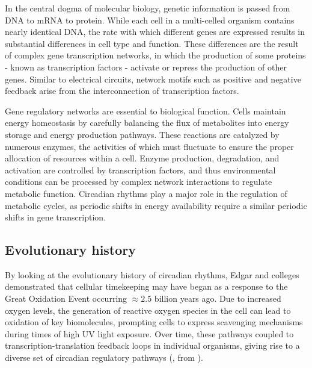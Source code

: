 In the central dogma of molecular biology, genetic information is passed from DNA to mRNA to protein. 
While each cell in a multi-celled organism contains nearly identical DNA, the rate with which different genes are expressed results in substantial differences in cell type and function. 
These differences are the result of complex gene transcription networks, in which the production of some proteins - known as transcription factors - activate or repress the production of other genes. 
Similar to electrical circuits, network motifs such as positive and negative feedback arise from the interconnection of transcription factors.

Gene regulatory networks are essential to biological function. 
Cells maintain energy homeostasis by carefully balancing the flux of metabolites into energy storage and energy production pathways. 
These reactions are catalyzed by numerous enzymes, the activities of which must fluctuate to ensure the proper allocation of resources within a cell.
Enzyme production, degradation, and activation are controlled by transcription factors, and thus environmental conditions can be processed by complex network interactions to regulate metabolic function.
Circadian rhythms play a major role in the regulation of metabolic cycles, as periodic shifts in energy availability require a similar periodic shifts in gene transcription.

\subsection{Evolutionary history}

By looking at the evolutionary history of circadian rhythms, Edgar and colleges \cite{Edgar2012} demonstrated that cellular timekeeping may have began as a response to the Great Oxidation Event occurring $\approx 2.5$ billion years ago. 
Due to increased oxygen levels, the generation of reactive oxygen species in the cell can lead to oxidation of key biomolecules, prompting cells to express scavenging mechanisms during times of high UV light exposure. 
Over time, these pathways coupled to transcription-translation feedback loops in individual organisms, giving rise to a diverse set of circadian regulatory pathways (, from \cite{Edgar2012}). 

